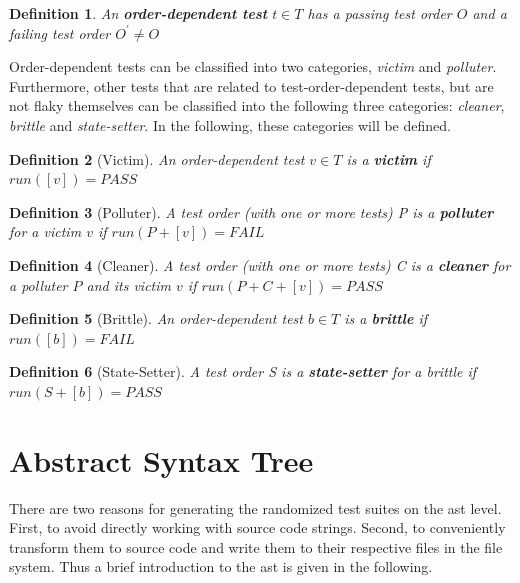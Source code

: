 \documentclass[
fancyheadings, %
%
%
]{stsreprt}
\newtheorem{definition}{Definition}
\begin{document}
\begin{definition}
    An \textbf{order-dependent test} $t \in T$ has a passing test order $O$ and a failing test order $O^{'} \neq O$
\end{definition}

Order-dependent tests can be classified into two categories, \textit{victim} and \textit{polluter}. Furthermore, other tests that are related to test-order-dependent tests, but are not flaky themselves can be classified into the following three categories: \textit{cleaner}, \textit{brittle} and \textit{state-setter}. In the following, these categories will be defined. 

\begin{definition}[Victim]
    An order-dependent test $v \in T$ is a \textbf{victim} if $run([v]) = PASS$
\end{definition} 

\begin{definition}[Polluter]
    A test order (with one or more tests) P is a \textbf{polluter} for a victim $v$ if $run(P + [v]) = FAIL$
\end{definition}

\begin{definition}[Cleaner]
    A test order (with one or more tests) C is a \textbf{cleaner} for a polluter $P$ and its victim $v$ if $run(P + C + [v]) = PASS$
\end{definition}

\begin{definition}[Brittle]
    An order-dependent test $b \in T$ is a \textbf{brittle} if $run([b]) = FAIL$
\end{definition}

\begin{definition}[State-Setter] %
    A test order S is a \textbf{state-setter} for a brittle if $run(S + [b]) = PASS$
\end{definition}

\section{Abstract Syntax Tree}
There are two reasons for generating the randomized test suites on the \acrlong{ast} level. 
First, to avoid directly working with source code strings. 
Second, to conveniently transform them to source code and write them to their respective files in the file system. 
Thus a brief introduction to the \acrshort{ast} is given in the following. \par
\end{document}
